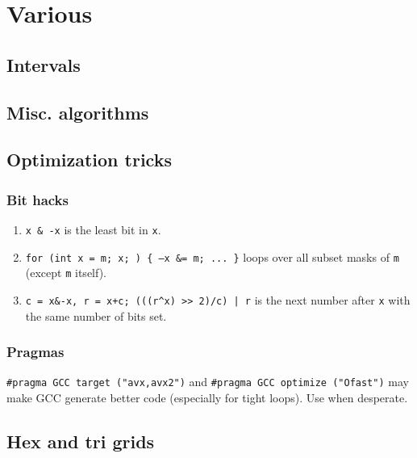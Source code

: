 
\chapter{Various}

	\section{Intervals}

	\section{Misc. algorithms}

	\section{Optimization tricks}
		\subsection{Bit hacks}
			\begin{enumerate}
			\item \texttt{x \& -x} is the least bit in \texttt{x}.
			\item \texttt{for (int x = m; x; ) \{ --x \&= m; ... \}} loops over all subset masks of \texttt{m} (except \texttt{m} itself).
			\item \texttt{c = x\&-x, r = x+c; (((r\^{}x) >> 2)/c) | r} is the next number after \texttt{x} with the same number of bits set.
			\end{enumerate}
		\subsection{Pragmas}
			\lstinline{#pragma GCC target ("avx,avx2")} and \lstinline{#pragma GCC optimize ("Ofast")} may make GCC generate better code (especially for tight loops). Use when desperate.

	\section{Hex and tri grids}
